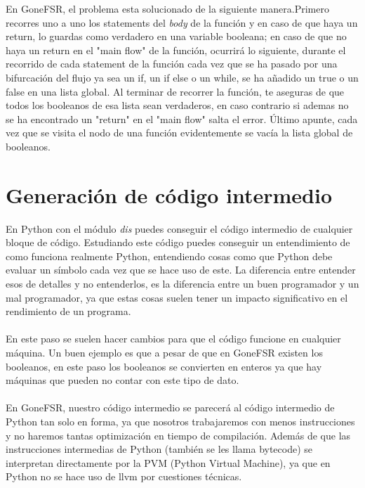 En GoneFSR, el problema esta solucionado de la siguiente manera.Primero recorres uno a uno los statements del \textit{body} de la función y en caso de que haya un return, lo guardas como verdadero en una variable booleana; en caso de que no haya un return en el "main flow" de la función, ocurrirá lo siguiente, durante el recorrido de cada statement de la función cada vez que se ha pasado por una bifurcación del flujo ya sea un if, un if else o un while, se ha añadido un true o un false en una lista global. Al terminar de recorrer la función, te aseguras de que todos los booleanos de esa lista sean verdaderos, en caso contrario si ademas no se ha encontrado un "return" en el "main flow" salta el error. Último apunte, cada vez que se visita el nodo de una función evidentemente se vacía la lista global de booleanos.
\section{Generación de código intermedio}
En Python con el módulo \textit{dis} puedes conseguir el código intermedio de cualquier bloque de código. Estudiando este código puedes conseguir un entendimiento de como funciona realmente Python, entendiendo cosas como que Python debe evaluar un símbolo cada vez que se hace uso de este. La diferencia entre entender esos de detalles y no entenderlos, es la diferencia entre un buen programador y un mal programador, ya que estas cosas suelen tener un impacto significativo en el rendimiento de un programa. \\\\
\noindent En este paso se suelen hacer cambios para que el código funcione en cualquier máquina. Un buen ejemplo es que a pesar de que en GoneFSR existen los booleanos, en este paso los booleanos se convierten en enteros ya que hay máquinas que pueden no contar con este tipo de dato. \\\\
En GoneFSR, nuestro código intermedio se parecerá al código intermedio de Python tan solo en forma, ya que nosotros trabajaremos con menos instrucciones y no haremos tantas optimización en tiempo de compilación. Además de que las instrucciones intermedias de Python (también se les llama bytecode) se interpretan directamente por la PVM (Python Virtual Machine), ya que en Python no se hace uso de llvm por cuestiones técnicas. \\\\

